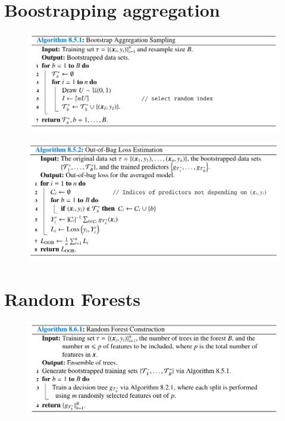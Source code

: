 \documentclass{beamer}
\begin{document}
\section{Boostrapping aggregation}

\begin{frame}
    \begin{figure}
        \includegraphics[width=0.9\linewidth]{A851Kroese}
    \end{figure}
\end{frame}

\begin{frame}
    \begin{figure}
        \includegraphics[width=0.9\linewidth]{A852Kroese}
    \end{figure}
\end{frame}

\section{Random Forests}

\begin{frame}
    \begin{figure}
        \includegraphics[width=0.9\linewidth]{A861Kroese}
    \end{figure}
\end{frame}
\end{document}
